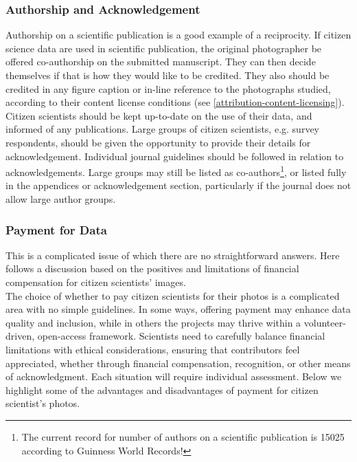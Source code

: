 \documentclass{article}
\newcommand{\contributed}[1]{%
    \par\noindent
    \begingroup
    \setlength{\leftskip}{1em}%
    \itshape
    Contributors: #1
    \par
    \endgroup
    \vspace{0.5em}
}
\begin{document}
\subsubsection{Authorship and Acknowledgement}\label{authorship-and-acknowledgement}
Authorship on a scientific publication is a good example of a reciprocity. If citizen science data are used in scientific publication, the original photographer be offered co-authorship on the submitted manuscript. They can then decide themselves if that is how they would like to be credited. They also should be credited in any figure caption or in-line reference to the photographs studied, according to their content license conditions (see \ref{attribution-content-licensing}). \\ 

Citizen scientists should be kept up-to-date on the use of their data, and informed of any publications. Large groups of citizen scientists, e.g. survey respondents, should be given the opportunity to provide their details for acknowledgement. Individual journal guidelines should be followed in relation to acknowledgements. Large groups may still be listed as co-authors\footnote{The current record for number of authors on a scientific publication is 15025 according to Guinness World Records!}, or listed fully in the appendices or acknowledgement section, particularly if the journal does not allow large author groups. \\

\subsubsection{Payment for Data}\label{payment-for-data}


This is a complicated issue of which there are no straightforward answers. Here follows a discussion based on the positives and limitations of financial compensation for citizen scientists' images.\\

The choice of whether to pay citizen scientists for their photos is a complicated area with no simple guidelines. In some ways, offering payment may enhance data quality and inclusion, while in others the projects may thrive within a volunteer-driven, open-access framework. Scientists need to carefully balance financial limitations with ethical considerations, ensuring that contributors feel appreciated, whether through financial compensation, recognition, or other means of acknowledgment. Each situation will require individual assessment. Below we highlight some of the advantages and disadvantages of payment for citizen scientist's photos.\\
\end{document}
